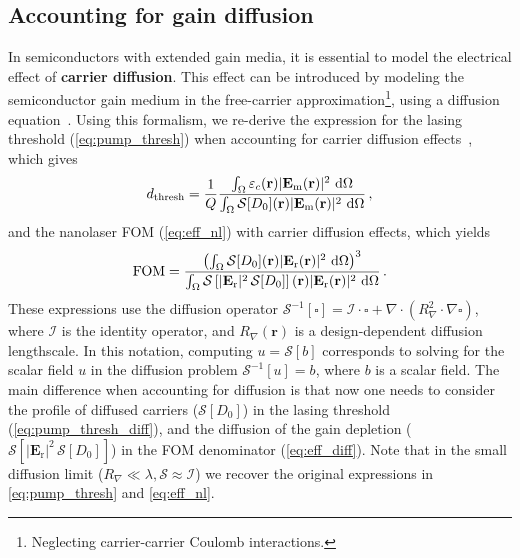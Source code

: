 \subsection*{Accounting for gain diffusion}

In semiconductors with extended gain media, it is essential to model the electrical effect of \textbf{carrier diffusion}. This effect can be introduced by modeling the semiconductor gain medium in the free-carrier approximation\footnote{Neglecting carrier-carrier Coulomb interactions.}, using a diffusion 
equation~\cite{csalt}. Using this formalism, we re-derive the expression for the lasing threshold (\eqref{eq:pump_thresh}) when accounting for carrier diffusion effects~\cite{ownpub4}, which gives
\begin{equation}\label{eq:pump_thresh_diff}
 d_\text{thresh} = \frac{1}{Q} \frac{\int_{\Omega} \varepsilon_c(\mathbf{r})|\mathbf{E}_{\text{m}}(\mathbf{r})|^2\, \mathop{}\!\text{d} \Omega}{\int_{\Omega} \mathcal{S} [D_0] (\mathbf{r}) |\mathbf{E}_{\text{m}}(\mathbf{r})|^2\, \mathop{}\!\text{d} \Omega}\,,
\end{equation}
and the nanolaser FOM (\eqref{eq:eff_nl}) with carrier diffusion effects, which yields
\begin{equation}\label{eq:eff_diff}
 \text{FOM} =  \frac{\left(\int_{\Omega} \mathcal{S} [D_0](\mathbf{r}) |\mathbf{E}_{\text{r}}(\mathbf{r})|^2 \, \mathop{}\!\text{d} \Omega\right)^3} {\int_{\Omega} \mathcal{S}\left[ |\mathbf{E}_{\text{r}}|^2\, \mathcal{S} [D_0] \right] (\mathbf{r})|\mathbf{E}_{\text{r}}(\mathbf{r})|^2 \, \mathop{}\!\text{d} \Omega}\,.
\end{equation}
These expressions use the diffusion operator $\mathcal{S}^{-1}[\square]= \mathcal{I}\cdot\square+\nabla \cdot (R_\nabla^2\cdot \nabla \square )$, where $\mathcal{I}$ is the identity operator, and $R_\nabla (\mathbf{r})$ is a design-dependent diffusion lengthscale.
In this notation, computing $u = \mathcal{S}[b]$ corresponds to solving for the scalar field $u$ in the diffusion problem $\mathcal{S}^{-1}[u]=b$, where $b$ is a scalar field. 
The main difference when accounting for diffusion is that now one needs to consider the profile of diffused carriers ($\mathcal{S} [D_0]$) in the lasing threshold (\eqref{eq:pump_thresh_diff}), and the diffusion of the gain depletion ($\mathcal{S}[ |\mathbf{E}_{\text{r}}|^2\, \mathcal{S} [D_0]]$)
in the FOM denominator (\eqref{eq:eff_diff}). Note that in the small diffusion limit ($R_\nabla \ll \lambda, \mathcal{S} \approx \mathcal{I}$)
we recover the original expressions in \eqref{eq:pump_thresh} and \eqref{eq:eff_nl}.

